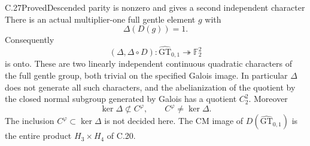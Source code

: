 \begin{statement}{C.27}{Proved}{Descended parity is nonzero and gives a second independent character}
There is an actual multiplier-one full gentle element $g$ with
\[
                         \Delta(D(g))=1.
 \tag{C.27.1}
\]
Consequently
\[
 (\Delta,\Delta\circ D):
       \widehat{\mathrm{GT}}_{0,1}\twoheadrightarrow\mathbb F_2^2
 \tag{C.27.2}
\]
is onto. These are two linearly independent continuous quadratic
characters of the full gentle group, both trivial on the specified
Galois image. In particular $\Delta$ does not generate all such
characters, and the abelianization of the quotient by the closed
normal subgroup generated by Galois has a quotient $C_2^2$.
Moreover
\[
             \ker\Delta\not\subset C^\varphi,\qquad
                    C^\varphi\ne\ker\Delta.
 \tag{C.27.3}
\]
The inclusion $C^\varphi\subset\ker\Delta$ is not decided here.
The CM image of $D(\widehat{\mathrm{GT}}_{0,1})$ is the entire
product $H_3\times H_4$ of C.20.
\end{statement}
